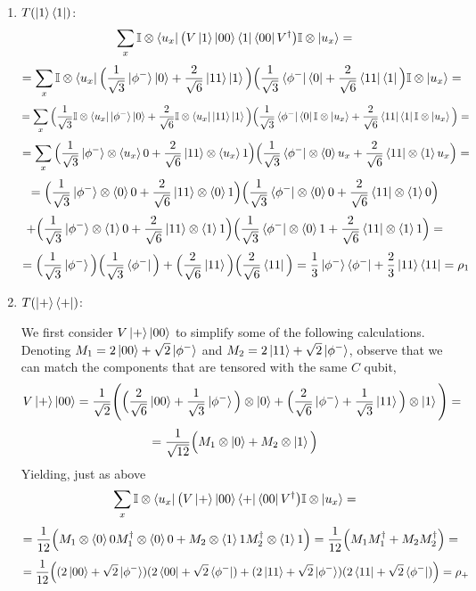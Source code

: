 \documentclass[12pt]{article}
\begin{document}
\begin{enumerate}
\begin{enumerate}
    \item $T(\ket{1}\bra{1})$:
$$ 
\sum_x \mathbb{I}\otimes \bra{u_x} \big(V \ket{1}\ket{00}\bra{1}\bra{00} V^\dagger \big)\mathbb{I}\otimes \ket{u_x} = $$
$$ = \sum_x \mathbb{I}\otimes \bra{u_x} 
\Big(
\frac{1}{\sqrt{3}} \ket{\phi^-}\ket{0} + \frac{2}{\sqrt{6}} \ket{11}\ket{1}\Big)
\Big(
\frac{1}{\sqrt{3}} \bra{\phi^-}\bra{0} + \frac{2}{\sqrt{6}} \bra{11}\bra{1}\Big)
\mathbb{I}\otimes \ket{u_x} =
$$
$$= \sum_x 
\Big(
\frac{1}{\sqrt{3}} \mathbb{I}\otimes \bra{u_x} \ket{\phi^-}\ket{0} + \frac{2}{\sqrt{6}} \mathbb{I}\otimes \bra{u_x} \ket{11}\ket{1}\Big)
\Big(
\frac{1}{\sqrt{3}} \bra{\phi^-}\bra{0} \mathbb{I}\otimes \ket{u_x} + \frac{2}{\sqrt{6}} \bra{11}\bra{1} \mathbb{I}\otimes \ket{u_x}\Big)
 =
$$
$$= \sum_x 
\Big(
\frac{1}{\sqrt{3}} \ket{\phi^-}\otimes\braket{u_x}{0} + \frac{2}{\sqrt{6}} \ket{11}\otimes \braket{u_x}{1}\Big)
\Big(
\frac{1}{\sqrt{3}} \bra{\phi^-}\otimes \braket{0}{u_x} + \frac{2}{\sqrt{6}} \bra{11}\otimes \braket{1}{u_x}\Big) = $$
$$= 
\Big(
\frac{1}{\sqrt{3}} \ket{\phi^-}\otimes\braket{0}{0} + \frac{2}{\sqrt{6}} \ket{11}\otimes \braket{0}{1}\Big)
\Big(
\frac{1}{\sqrt{3}} \bra{\phi^-}\otimes \braket{0}{0} + \frac{2}{\sqrt{6}} \bra{11}\otimes \braket{1}{0}\Big) $$ 
$$ + 
\Big(
\frac{1}{\sqrt{3}} \ket{\phi^-}\otimes\braket{1}{0} + \frac{2}{\sqrt{6}} \ket{11}\otimes \braket{1}{1}\Big)
\Big(
\frac{1}{\sqrt{3}} \bra{\phi^-}\otimes \braket{0}{1} + \frac{2}{\sqrt{6}} \bra{11}\otimes \braket{1}{1}\Big)= $$
$$= 
\Big(
\frac{1}{\sqrt{3}} \ket{\phi^-} \Big)
\Big(
\frac{1}{\sqrt{3}} \bra{\phi^-} \Big) + 
\Big(
\frac{2}{\sqrt{6}} \ket{11}\Big)
\Big(
\frac{2}{\sqrt{6}} \bra{11}\Big)= \frac{1}{3} \ket{\phi^-}\bra{\phi^-} + \frac{2}{3} \ket{11}\bra{11} = \rho_1 $$
    \item $T(\ket{+}\bra{+})$:

We first consider $V\ket{+}\ket{00}$ to simplify some of the following calculations. Denoting $M_1 = 2\ket{00} + \sqrt{2} \ket{\phi^-}$ and $M_2 = 2\ket{11} + \sqrt{2} \ket{\phi^-}$, observe that we can match the components that are tensored with the same $C$ qubit,
$$ V\ket{+}\ket{00} = \frac{1}{\sqrt{2}} \Bigg( \Big(\frac{2}{\sqrt{6}}\ket{00} + \frac{1}{\sqrt{3}}\ket{\phi^-}  \Big) \otimes \ket{0} + \Big(\frac{2}{\sqrt{6}}\ket{\phi^-} + \frac{1}{\sqrt{3}}\ket{11} \Big) \otimes \ket{1} \Bigg) = $$
$$ = \frac{1}{\sqrt{12}} \Big( M_1 \otimes \ket{0} + M_2 \otimes \ket{1} \Big)$$
Yielding, just as above
$$ 
\sum_x \mathbb{I}\otimes \bra{u_x} \big(V \ket{+}\ket{00}\bra{+}\bra{00} V^\dagger \big)\mathbb{I}\otimes \ket{u_x} = $$
$$= \frac{1}{12} \Big( M_1 \otimes \braket{0}{0} M_1^\dagger \otimes \braket{0}{0} + M_2 \otimes \braket{1}{1} M_2^\dagger \otimes \braket{1}{1} \Big) = \frac{1}{12} \Big( M_1M_1^\dagger + M_2M_2^\dagger\Big) = 
$$
$$ = \frac{1}{12}\Big((2\ket{00} + \sqrt{2} \ket{\phi^-})(2\bra{00} + \sqrt{2} \bra{\phi^-}) + (2\ket{11} + \sqrt{2} \ket{\phi^-})(2\bra{11} + \sqrt{2} \bra{\phi^-})\Big) = \rho_+$$


\end{enumerate}
\end{enumerate}
\end{document}
